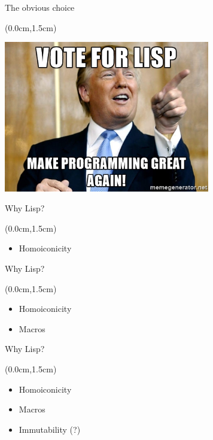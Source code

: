 \documentclass[xetex,14pt,aspectratio=169]{beamer}
\begin{document}
\begin{frame}{The obvious choice}
\begin{textblock*}{\framewidth-0.8cm}(0.0cm,1.5cm) %
\begin{minipage}{\textwidth}
  \centering
  \includegraphics[height=6.6cm]{img/vote-lisp}
\end{minipage}
\end{textblock*}
\end{frame}

\begin{frame}{Why Lisp?}
\begin{textblock*}{\framewidth-0.8cm}(0.0cm,1.5cm) %
\begin{itemize}
  \item Homoiconicity
\end{itemize}
\end{textblock*}
\end{frame}

\begin{frame}{Why Lisp?}
\begin{textblock*}{\framewidth-0.8cm}(0.0cm,1.5cm) %
\begin{itemize}
  \item Homoiconicity
  \item Macros
\end{itemize}
\end{textblock*}
\end{frame}

\begin{frame}{Why Lisp?}
\begin{textblock*}{\framewidth-0.8cm}(0.0cm,1.5cm) %
\begin{itemize}
  \item Homoiconicity
  \item Macros
  \item Immutability (?)
\end{itemize}
\end{textblock*}
\end{frame}
\end{document}
